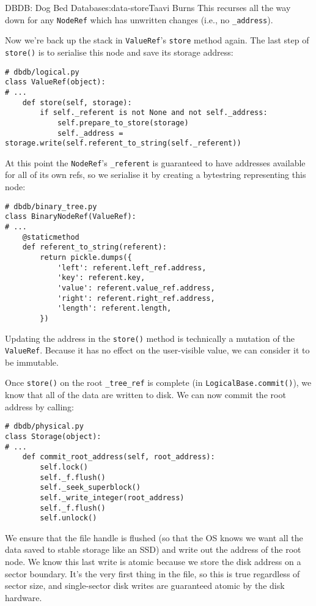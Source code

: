 \begin{aosachapter}{DBDB: Dog Bed Database}{s:data-store}{Taavi Burns}
This recurses all the way down for any \texttt{NodeRef} which has
unwritten changes (i.e., no \texttt{\_address}).

Now we're back up the stack in \texttt{ValueRef}'s \texttt{store} method
again. The last step of \texttt{store()} is to serialise this node and
save its storage address:

\begin{verbatim}
# dbdb/logical.py
class ValueRef(object):
# ...
    def store(self, storage):
        if self._referent is not None and not self._address:
            self.prepare_to_store(storage)
            self._address = storage.write(self.referent_to_string(self._referent))
\end{verbatim}

At this point the \texttt{NodeRef}'s \texttt{\_referent} is guaranteed
to have addresses available for all of its own refs, so we serialise it
by creating a bytestring representing this node:

\begin{verbatim}
# dbdb/binary_tree.py
class BinaryNodeRef(ValueRef):
# ...
    @staticmethod
    def referent_to_string(referent):
        return pickle.dumps({
            'left': referent.left_ref.address,
            'key': referent.key,
            'value': referent.value_ref.address,
            'right': referent.right_ref.address,
            'length': referent.length,
        })
\end{verbatim}

Updating the address in the \texttt{store()} method is technically a
mutation of the \texttt{ValueRef}. Because it has no effect on the
user-visible value, we can consider it to be immutable.

Once \texttt{store()} on the root \texttt{\_tree\_ref} is complete (in
\texttt{LogicalBase.commit()}), we know that all of the data are written
to disk. We can now commit the root address by calling:

\begin{verbatim}
# dbdb/physical.py
class Storage(object):
# ...
    def commit_root_address(self, root_address):
        self.lock()
        self._f.flush()
        self._seek_superblock()
        self._write_integer(root_address)
        self._f.flush()
        self.unlock()
\end{verbatim}

We ensure that the file handle is flushed (so that the OS knows we want
all the data saved to stable storage like an SSD) and write out the
address of the root node. We know this last write is atomic because we
store the disk address on a sector boundary. It's the very first thing
in the file, so this is true regardless of sector size, and
single-sector disk writes are guaranteed atomic by the disk hardware.


\end{aosachapter}
